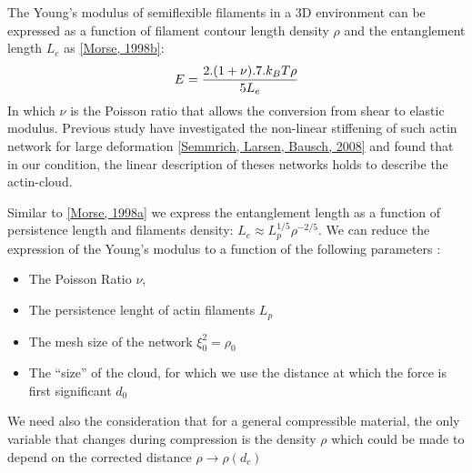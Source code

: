 \documentclass[A4paperpaper,11pt,english]{sphinxmanual}
\begin{document}
The Young's modulus of semiflexible filaments in a 3D environment can be
expressed as a function of filament contour length density \(\rho\) and the
entanglement length \(L_e\) as {\hyperref[parts/part3:morse1998b]{{[}Morse,  1998b{]}}}:
\begin{gather}
\begin{split}E= \frac{2.(1+\nu).7.k_BT \rho}{5L_e}\end{split}\notag
\end{gather}
In which \(\nu\) is the Poisson ratio that allows the conversion from shear to
elastic modulus. Previous study have investigated the non-linear stiffening of
such actin network for large deformation {\hyperref[parts/part3:semmrich2008]{{[}Semmrich, Larsen, Bausch,  2008{]}}} and found that in
our condition, the linear description of theses networks holds to describe the
actin-cloud.

Similar to {\hyperref[parts/part3:morse1998a]{{[}Morse,  1998a{]}}} we express the entanglement length as a
function of persistence length and filaments density: \(L_e\approx L_p^{1/5} \rho^{-2/5}\). We can
reduce the expression of the Young's modulus to a function of the following
parameters :
\begin{itemize}
\item {} 
The Poisson Ratio \(\nu\),

\item {} 
The persistence lenght of actin filaments \(L_p\)

\item {} 
The mesh size of the network \(\xi_0^2 = \rho_0\)

\item {} 
The ``size'' of the cloud, for which we use the distance at which the force
is first significant \(d_0\)

\end{itemize}

We need also the consideration that for a general compressible material, the
only variable that changes during compression is the density \(\rho\)
which could be made to depend on the corrected distance \(\rho \to
\rho(d_c)\)
\end{document}
